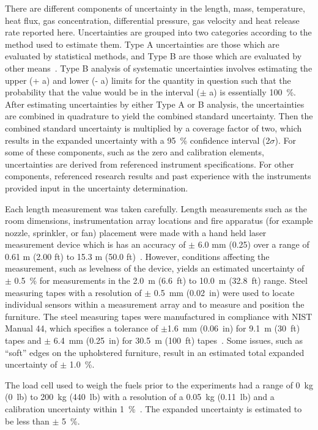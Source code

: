 \documentclass[12pt,oneside]{book}
\begin{document}
There are different components of uncertainty in the length, mass, temperature, heat flux, gas concentration, differential pressure, gas velocity and heat release rate reported here. Uncertainties are grouped into two categories according to the method used to estimate them. Type A uncertainties are those which are evaluated by statistical methods, and Type B are those which are evaluated by other means~\cite{Taylor&Kuyatt:1994}. Type B analysis of systematic uncertainties involves estimating the upper (+ a) and lower (- a) limits for the quantity in question such that the probability that the value would be in the interval ($\pm$ a) is essentially 100~\%. After estimating uncertainties by either Type A or B analysis, the uncertainties are combined in quadrature to yield the combined standard uncertainty. Then the combined standard uncertainty is multiplied by a coverage factor of two, which results in the expanded uncertainty with a 95~\% confidence interval (2$\sigma$).  For some of these components, such as the zero and calibration elements, uncertainties are derived from referenced instrument specifications. For other components, referenced research results and past experience with the instruments provided input in the uncertainty determination.

Each length measurement was taken carefully. Length measurements such as the room dimensions, instrumentation array locations and fire apparatus (for example nozzle, sprinkler, or fan) placement were made with a hand held laser measurement device which is has an accuracy of $\pm$ 6.0 mm (0.25) over a range of 0.61 m (2.00 ft) to 15.3 m (50.0 ft)~\cite{StanleyTools}.  However, conditions affecting the measurement, such as levelness of the device, yields an estimated uncertainty of $\pm$ 0.5~\% for measurements in the 2.0~m (6.6~ft) to 10.0~m (32.8~ft) range.  Steel measuring tapes with a resolution of  $\pm$ 0.5~mm (0.02~in) were used to locate individual sensors within a measurement array and to measure and position the furniture. The steel measuring tapes were manufactured in compliance with NIST Manual 44, which specifies a tolerance of $\pm$1.6~mm (0.06~in) for 9.1~m (30~ft) tapes and $\pm$ 6.4~mm (0.25~in) for 30.5~m (100~ft) tapes~\cite{Butcher:2012}. Some issues, such as ``soft'' edges on the upholstered furniture, result in an estimated total expanded uncertainty of $\pm$ 1.0~\%.

The load cell used to weigh the fuels prior to the experiments had a range of 0~kg (0~lb) to 200~kg (440~lb) with a resolution of a 0.05~kg (0.11~lb) and a calibration uncertainty within 1~\%~\cite{Ohaus:2000}. The expanded uncertainty is estimated to be less than $\pm$ 5~\%.
\end{document}
